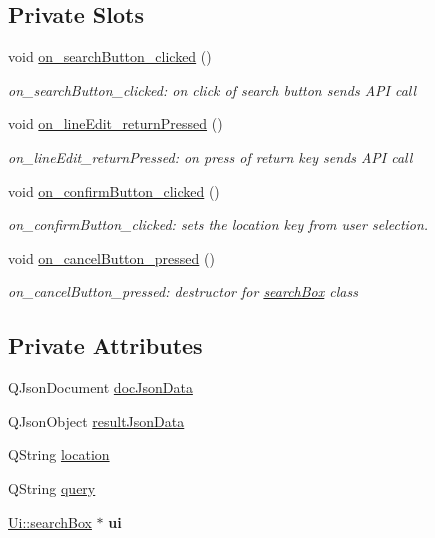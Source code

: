 \subsection*{Private Slots}
\begin{DoxyCompactItemize}
\item 
void \hyperlink{classstd_1_1searchBox_ab115b20ee0bfcf98095e3bb6ca9b8dca}{on\+\_\+search\+Button\+\_\+clicked} ()
\begin{DoxyCompactList}\small\item\em on\+\_\+search\+Button\+\_\+clicked\+: on click of search button sends A\+PI call \end{DoxyCompactList}\item 
void \hyperlink{classstd_1_1searchBox_aa8ed50f177d20e64e215b82839813a6f}{on\+\_\+line\+Edit\+\_\+return\+Pressed} ()
\begin{DoxyCompactList}\small\item\em on\+\_\+line\+Edit\+\_\+return\+Pressed\+: on press of return key sends A\+PI call \end{DoxyCompactList}\item 
void \hyperlink{classstd_1_1searchBox_a72fb214318fd15e5203cb230cd1cf7b4}{on\+\_\+confirm\+Button\+\_\+clicked} ()
\begin{DoxyCompactList}\small\item\em on\+\_\+confirm\+Button\+\_\+clicked\+: sets the location key from user selection. \end{DoxyCompactList}\item 
\mbox{\label{classstd_1_1searchBox_ab69249e3681992c9dfe252f3d571dab3}} 
void \hyperlink{classstd_1_1searchBox_ab69249e3681992c9dfe252f3d571dab3}{on\+\_\+cancel\+Button\+\_\+pressed} ()
\begin{DoxyCompactList}\small\item\em on\+\_\+cancel\+Button\+\_\+pressed\+: destructor for \hyperlink{classstd_1_1searchBox}{search\+Box} class \end{DoxyCompactList}\end{DoxyCompactItemize}
\subsection*{Private Attributes}
\begin{DoxyCompactItemize}
\item 
Q\+Json\+Document \hyperlink{classstd_1_1searchBox_a6a9fbaeaa1c7aa1404e4f2c3baf6fd84}{doc\+Json\+Data}
\item 
Q\+Json\+Object \hyperlink{classstd_1_1searchBox_a3c8548638d130a68df6b3ae74a1b1048}{result\+Json\+Data}
\item 
Q\+String \hyperlink{classstd_1_1searchBox_a02d951e4331a6b3a598b59d997a6564e}{location}
\item 
Q\+String \hyperlink{classstd_1_1searchBox_aea961f663dcd293eaa5ba38828f730e4}{query}
\item 
\mbox{\label{classstd_1_1searchBox_a65cdb1f599848d927f12f6df78598b17}} 
\hyperlink{classUi_1_1searchBox}{Ui\+::search\+Box} $\ast$ {\bfseries ui}
\end{DoxyCompactItemize}


